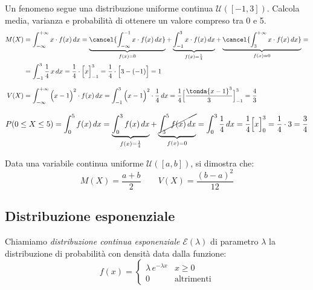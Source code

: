\begin{esempio} Un fenomeno segue una distribuzione uniforme continua $\mathcal{U} ([-1,3])$. Calcola media, varianza e probabilità di ottenere un valore compreso tra 0 e 5.
\[\begin{split}M(X) &=  \int_{-\infty}^{+\infty} x\cdot f(x) \,dx = \underbrace{\cancel{\int_{-\infty}^{-1} x\cdot f(x) \,dx}}_{f(x)=0}+\underbrace{\int_{-1}^{3} x\cdot f(x) \,dx}_{f(x) = \frac{1}{4}}+ \underbrace{\cancel{\int_{3}^{+\infty} x\cdot f(x) \,dx}}_{f(x)=0} = \\ &=\int_{-1}^{3}  \frac{1}{4}\, x \,dx =\frac{1}{4} \cdot \Big[   x \Big]_{-1}^3 = \frac{1}{4}\cdot \Big[   3-(-1) \Big] = 1\\[6pt]
V(X) &=  \int_{-\infty}^{+\infty}\Big(x-1\Big)^2\cdot f(x) \,dx = \int_{-1}^{3}\Big(x-1\Big)^2\cdot \frac{1}{4} \,dx= \frac{1}{4} \Big[\frac{\tonda{x-1}^3}{3}\Big]_{-1}^3 = \frac{4}{3}  \\[6pt]
\end{split}\]
\[P(0\leq X \leq 5) =  \int_{0}^{5}  f(x) \,dx =  \underbrace{\int_{0}^{3} f(x) \,dx}_{f(x) = \frac{1}{4}}+ \underbrace{\cancel{\int_{3}^{5} f(x) \,dx}}_{f(x)=0} = \int_0^3 \frac{1}{4} \,dx = \frac{1}{4} \Big[x\Big]_0^3 = \frac{1}{4} \cdot 3 = \frac{3}{4}\]
\end{esempio}

\begin{proprieta} Data una variabile continua uniforme $\mathcal{U}([a,b])$, si dimostra che: 
\[\boxed{M(X) =\dfrac{a+b}{2}} \qquad \boxed{V(X) = \dfrac{(b-a)^2}{12}}\]
\end{proprieta}


\subsection{Distribuzione esponenziale}

\begin{definizione} Chiamiamo \emph{distribuzione continua esponenziale} $\mathcal{E}(\lambda)$ di parametro $\lambda$ la distribuzione di probabilità con densità data dalla funzione:
\[f(x) = \begin{cases} \lambda \, e^{-\lambda x} & x \geq 0 \\
0 & \text{altrimenti}\end{cases}\]
\end{definizione}

